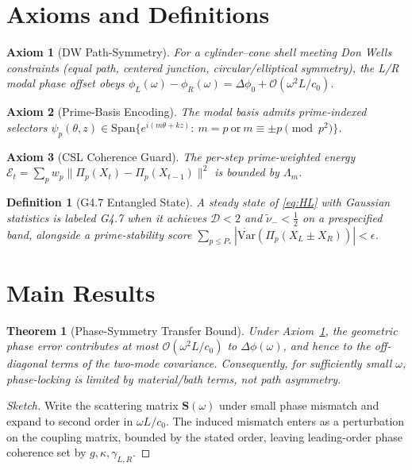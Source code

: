\documentclass[11pt]{article}
\newtheorem{axiom}{Axiom}
\newtheorem{definition}{Definition}
\newtheorem{theorem}{Theorem}
\begin{document}
\section{Axioms and Definitions}
\begin{axiom}[DW Path-Symmetry]
\label{ax:DW}
For a cylinder--cone shell meeting Don Wells constraints (equal path, centered junction, circular/elliptical symmetry), the L/R modal phase offset obeys
\(\phi_L(\omega)-\phi_R(\omega)=\Delta\phi_0+\mathcal O(\omega^2 L/c_0)\).
\end{axiom}

\begin{axiom}[Prime-Basis Encoding]
\label{ax:primebasis}
The modal basis admits prime-indexed selectors \(\psi_p(\theta,z)\in\mathrm{Span}\{e^{i(m\theta+kz)}:\ m=p\ \text{or}\ m\equiv \pm p\!\!\!\pmod{p^2}\}\).
\end{axiom}

\begin{axiom}[CSL Coherence Guard]
\label{ax:CSL}
The per-step prime-weighted energy
\(\mathcal E_t=\sum_{p}w_p\|\Pi_p(X_t)-\Pi_p(X_{t-1})\|^2\) is bounded by \(\Lambda_m\).
\end{axiom}

\begin{definition}[G4.7 Entangled State]
A steady state of \eqref{eq:HL} with Gaussian statistics is labeled G4.7 when it achieves
\(\mathcal D<2\) and \(\tilde\nu_-<\tfrac12\) on a prespecified band, alongside a prime-stability score \(\sum_{p\le P_*}|\dot{\mathrm{Var}}(\Pi_p(X_L\!\pm\!X_R))|<\epsilon\).
\end{definition}

\section{Main Results}
\begin{theorem}[Phase-Symmetry Transfer Bound]
\label{thm:phase}
Under Axiom~\ref{ax:DW}, the geometric phase error contributes at most \(\mathcal O(\omega^2 L/c_0)\) to \(\Delta\phi(\omega)\), and hence to the off-diagonal terms of the two-mode covariance. Consequently, for sufficiently small \(\omega\), phase-locking is limited by material/bath terms, not path asymmetry.
\end{theorem}
\begin{proof}[Sketch]
Write the scattering matrix \(\mathbf S(\omega)\) under small phase mismatch and expand to second order in \(\omega L/c_0\). The induced mismatch enters as a perturbation on the coupling matrix, bounded by the stated order, leaving leading-order phase coherence set by \(g,\kappa,\gamma_{L,R}\).
\end{proof}
\end{document}
